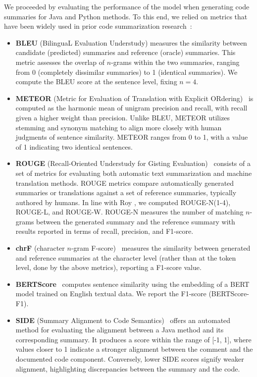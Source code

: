 We proceeded by evaluating the performance of the model when generating code summaries for Java and Python methods. To this end, we relied on metrics that have been widely used in prior code summarization research~\cite{zhang2022survey,zhang2020retrieval,leclair2020improved}: 
\begin{itemize}[itemindent=0.3cm,leftmargin=0cm,label=]
	\setlength\itemsep{0.1cm}
	
\item \textbf{BLEU} (BilinguaL Evaluation Understudy) \cite{bleu} measures the similarity between candidate (predicted) summaries and reference (oracle) summaries. This metric assesses the overlap of $n$-grams within the two summaries, ranging from 0 (completely dissimilar summaries) to 1 (identical summaries). We compute the BLEU score at the sentence level, fixing $n=4$.

\item \textbf{METEOR} (Metric for Evaluation of Translation with Explicit ORdering)~\cite{meteor} is computed as the harmonic mean of unigram precision and recall, with recall given a higher weight than precision. Unlike BLEU, METEOR utilizes stemming and synonym matching to align more closely with human judgments of sentence similarity. METEOR ranges from 0 to 1, with a value of 1 indicating two identical sentences.

\item \textbf{ROUGE} (Recall-Oriented Understudy for Gisting Evaluation)~\cite{lin2004rouge}  consists of a set of metrics for evaluating both automatic text summarization and machine translation methods. ROUGE metrics compare automatically generated summaries or translations against a set of reference summaries, typically authored by humans. In line with Roy \etal \cite{roy2021reassessing}, we computed ROUGE-N(1-4), ROUGE-L, and ROUGE-W. ROUGE-N measures the number of matching $n$-grams between the generated summary and the reference summary with results reported in terms of recall, precision, and F1-score.

\item \textbf{chrF} (character $n$-gram F-score)~\cite{popovic2015chrf} measures the similarity between generated and reference summaries at the character level (rather than at the token level, done by the above metrics), reporting  a F1-score value.

\item \textbf{BERTScore}~\cite{zhang2019bertscore} computes sentence similarity using the embedding of a BERT model \cite{devlin2018bert} trained on English textual data. We report the F1-score (BERTScore-F1).

\item \textbf{SIDE} (Summary Alignment to Code Semantics)~\cite{mastropaolo2024evaluating} offers an automated method for evaluating the alignment between a Java method and its corresponding summary. It produces a score within the range of [-1, 1], where values closer to 1 indicate a stronger alignment between the comment and the documented code component. Conversely, lower SIDE scores signify weaker alignment, highlighting discrepancies between the summary and the code.
\end{itemize}

